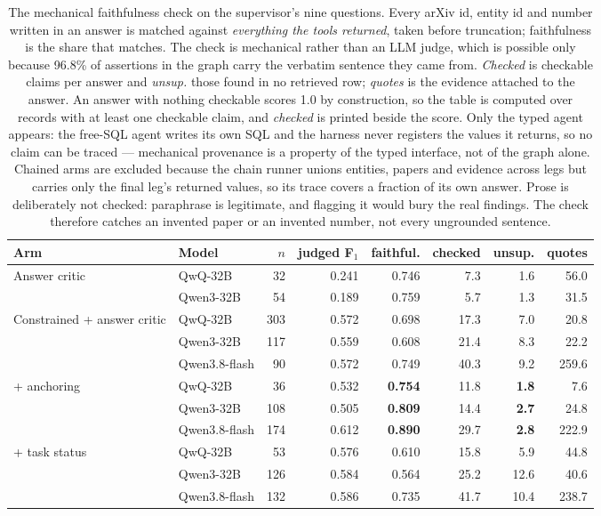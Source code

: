 \begin{table}[htbp]
\centering
\small
\begin{tabular}{llrrrrrr}
\toprule
Arm & Model & $n$ & judged F$_1$ & faithful. & checked & unsup. & quotes \\
\midrule
Answer critic
 & QwQ-32B        &  32 & 0.241 & 0.746 &  7.3 & 1.6 &  56.0 \\
 & Qwen3-32B      &  54 & 0.189 & 0.759 &  5.7 & 1.3 &  31.5 \\
\midrule
Constrained + answer critic
 & QwQ-32B        & 303 & 0.572 & 0.698 & 17.3 & 7.0 &  20.8 \\
 & Qwen3-32B      & 117 & 0.559 & 0.608 & 21.4 & 8.3 &  22.2 \\
 & Qwen3.8-flash  &  90 & 0.572 & 0.749 & 40.3 & 9.2 & 259.6 \\
\midrule
\quad + anchoring
 & QwQ-32B        &  36 & 0.532 & \textbf{0.754} & 11.8 & \textbf{1.8} &   7.6 \\
 & Qwen3-32B      & 108 & 0.505 & \textbf{0.809} & 14.4 & \textbf{2.7} &  24.8 \\
 & Qwen3.8-flash  & 174 & 0.612 & \textbf{0.890} & 29.7 & \textbf{2.8} & 222.9 \\
\midrule
\quad + task status
 & QwQ-32B        &  53 & 0.576 & 0.610 & 15.8 &  5.9 &  44.8 \\
 & Qwen3-32B      & 126 & 0.584 & 0.564 & 25.2 & 12.6 &  40.6 \\
 & Qwen3.8-flash  & 132 & 0.586 & 0.735 & 41.7 & 10.4 & 238.7 \\
\bottomrule
\end{tabular}
\caption[Provenance of the answers]{The mechanical faithfulness check on the
supervisor's nine questions. Every arXiv id, entity id and number written in an
answer is matched against \emph{everything the tools returned}, taken before
truncation; faithfulness is the share that matches. The check is mechanical
rather than an LLM judge, which is possible only because 96.8\% of assertions in
the graph carry the verbatim sentence they came from. \emph{Checked} is
checkable claims per answer and \emph{unsup.} those found in no retrieved row;
\emph{quotes} is the evidence attached to the answer. An answer with nothing
checkable scores 1.0 by construction, so the table is computed over records with
at least one checkable claim, and \emph{checked} is printed beside the score.
Only the typed agent appears: the free-SQL agent writes its own SQL and the
harness never registers the values it returns, so no claim can be traced ---
mechanical provenance is a property of the typed interface, not of the graph
alone. Chained arms are excluded because the chain runner unions entities,
papers and evidence across legs but carries only the final leg's returned values,
so its trace covers a fraction of its own answer. Prose is deliberately not
checked: paraphrase is legitimate, and flagging it would bury the real findings.
The check therefore catches an invented paper or an invented number, not every
ungrounded sentence.}
\label{tab:provenance}
\end{table}

